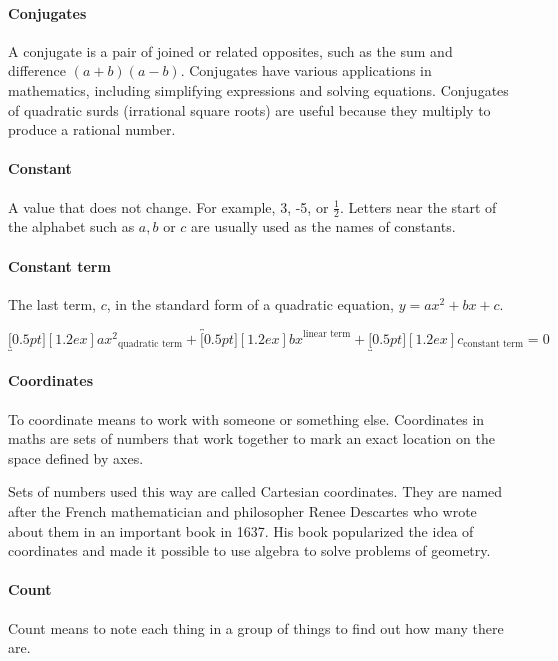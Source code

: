 \documentclass[12pt]{article}
\begin{document}
\paragraph{Conjugates}
A conjugate is a pair of joined or related opposites, such as the sum and difference $(a+b)(a-b)$. Conjugates have various applications in mathematics, including simplifying expressions and solving equations. Conjugates of quadratic surds (irrational square roots) are useful because they multiply to produce a rational number.

\paragraph{Constant}
A value that does not change. For example, 3, -5, or \(\frac{1}{2}\). Letters near the start of the alphabet such as $a, b$ or $c$ are usually used as the names of constants.

\paragraph{Constant term}
The last term, $c$, in the standard form of a quadratic equation, $y=ax^2+bx+c$.

\begin{center}
{\Large$\underbracket[0.5pt][1.2ex]{ax^2}_{\textrm{quadratic term}}+\overbracket[0.5pt][1.2ex]{bx}^{\textrm{linear term}}+\underbracket[0.5pt][1.2ex]{c}_{\textrm{constant term}}=0$}
\end{center}

\paragraph{Coordinates}
To coordinate means to work with someone or something else. Coordinates in maths are sets of numbers that work together to mark an exact location on the space defined by axes.

Sets of numbers used this way are called Cartesian coordinates. They are named after the French mathematician and philosopher Renee Descartes who wrote about them in an important book in 1637. His book popularized the idea of coordinates and made it possible to use algebra to solve problems of geometry.

\paragraph{Count}
Count means to note each thing in a group of things to find out how many there are.
\end{document}
